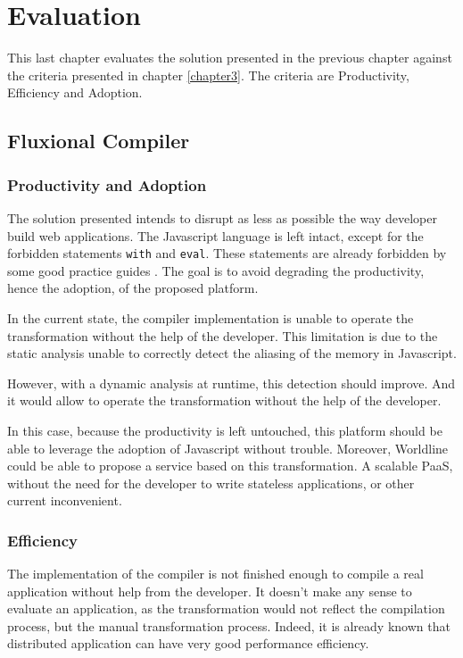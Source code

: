 \chapter{Evaluation} \label{chapter6}
\minitoc
\eject

This last chapter evaluates the solution presented in the previous chapter against the criteria presented in chapter \ref{chapter3}.
The criteria are Productivity, Efficiency and Adoption.

\section{Fluxional Compiler}

\subsection{Productivity and Adoption}

The solution presented intends to disrupt as less as possible the way developer build web applications.
The Javascript language is left intact, except for the forbidden statements \texttt{with} and \texttt{eval}.
These statements are already forbidden by some good practice guides \cite{Crockford2008}.
The goal is to avoid degrading the productivity, hence the adoption, of the proposed platform.

In the current state, the compiler implementation is unable to operate the transformation without the help of the developer.
This limitation is due to the static analysis unable to correctly detect the aliasing of the memory in Javascript.

However, with a dynamic analysis at runtime, this detection should improve.
And it would allow to operate the transformation without the help of the developer.

In this case, because the productivity is left untouched, this platform should be able to leverage the adoption of Javascript without trouble.
Moreover, Worldline could be able to propose a service based on this transformation.
A scalable PaaS, without the need for the developer to write stateless applications, or other current inconvenient.


\subsection{Efficiency}

The implementation of the compiler is not finished enough to compile a real application without help from the developer.
It doesn't make any sense to evaluate an application, as the transformation would not reflect the compilation process, but the manual transformation process.
Indeed, it is already known that distributed application can have very good performance efficiency.

